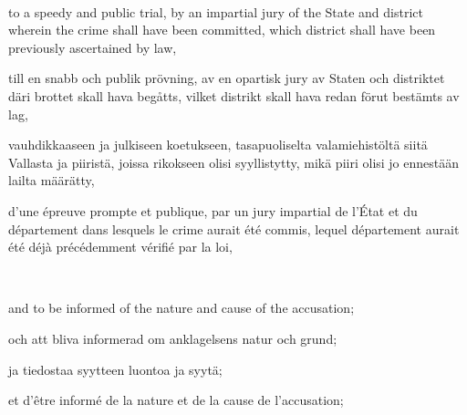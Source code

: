 \documentclass[a4,landscape,12pt]{article}
\begin{document}
~

\begin{minipage}[t]{0.22\textwidth}
 to a speedy and public trial, by an impartial jury of the State and district wherein the crime shall have been committed, which district shall have been previously ascertained by law,
\end{minipage}\textwidth
\begin{minipage}[t]{0.22\textwidth}
till en snabb och publik prövning, av en opartisk jury av Staten och distriktet däri brottet skall hava begåtts, vilket distrikt skall hava redan förut bestämts av lag,
\end{minipage}\textwidth
\begin{minipage}[t]{0.22\textwidth}
vauhdikkaaseen ja julkiseen koetukseen, tasapuoliselta valamiehistöltä siitä Vallasta ja piiristä, joissa rikokseen olisi syyllistytty, mikä piiri olisi jo ennestään lailta määrätty,
\end{minipage}\textwidth
\begin{minipage}[t]{0.22\textwidth}
d'une épreuve prompte et publique, par un jury impartial de l'État et du département dans lesquels le crime aurait été commis, lequel département aurait été déjà précédemment vérifié par la loi,
\end{minipage}

~

\begin{minipage}[t]{0.22\textwidth}
and to be informed of the nature and cause of the accusation;
\end{minipage}\textwidth
\begin{minipage}[t]{0.22\textwidth}
och att bliva informerad om anklagelsens natur och grund;
\end{minipage}\textwidth
\begin{minipage}[t]{0.22\textwidth}
ja tiedostaa syytteen luontoa ja syytä;
\end{minipage}\textwidth
\begin{minipage}[t]{0.22\textwidth}
et d'être informé de la nature et de la cause de l'accusation;
\end{minipage}

~
\end{document}
